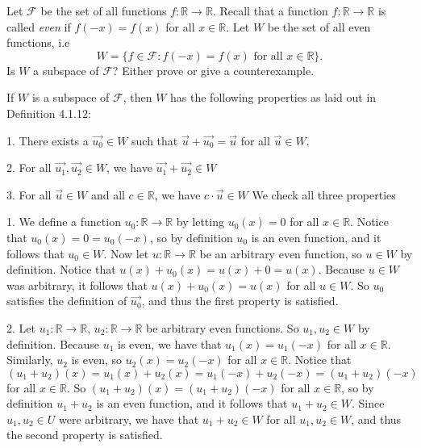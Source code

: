 \documentclass[12pt]{article}
\newenvironment{problem}[2][Problem]
{
	\begin{trivlist} 
		\item[\hskip \labelsep {\bfseries #1 #2:}]
	}
{
	\end{trivlist}
	}
\newenvironment{solution}[1][Solution]
{
	\begin{trivlist} 
		\item[\hskip \labelsep {\itshape #1:}]
	}
	{
	\end{trivlist}
}
\begin{document}
\newpage
\begin{problem}{6}
Let $\mathcal{F}$ be the set of all functions $f: \mathbb{R} \to \mathbb{R}$. Recall that a function $f: \mathbb{R} \to \mathbb{R}$ is called {\it even} if $f(-x) = f(x)$ for all $x \in \mathbb{R}$. Let $W$ be the set of all even functions, i.e
\[
W = \{ f \in \mathcal{F} : f(-x) = f(x) \text{ for all } x \in \mathbb{R} \} \text{.}
\]
Is $W$ a subspace of $\mathcal{F}$? Either prove or give a counterexample.
\noindent
\newline
\newline
\begin{solution}
 If $W$ is a subspace of $\mathcal{F}$, then $W$ has the following properties as laid out in Definition 4.1.12:

1. There exists a $\vec{u_0} \in W$ such that $\vec{u} + \vec{u_0} = \vec{u}$ for all $\vec{u} \in W$.

2. For all $\vec{u_1},\vec{u_2} \in W$, we have $\vec{u_1}+\vec{u_2} \in W$

3. For all $\vec{u} \in W$ and all $c \in \mathbb{R}$, we have $c\cdot \vec{u} \in W$
\noindent
\newline
\newline
We check all three properties

1. We define a function $u_0 :\mathbb{R} \to \mathbb{R}$ by letting $u_0 (x)=0$ for all $x \in \mathbb{R}$. Notice that $u_0 (x) = 0 = u_0(-x)$, so by definition $u_0$ is an even function, and it follows that $u_0 \in W$. Now let $u:\mathbb{R} \to \mathbb{R}$ be an arbitrary even function, so $u \in W$ by definition. Notice that $u(x) + u_0 (x) = u(x) + 0 = u(x)$. Because $u \in W$ was arbitrary, it follows that $u(x)+u_0(x) = u(x)$ for all $u \in W$. So $u_0$ satisfies the definition of $\vec{u_0}$, and thus the first property is satisfied.

2. Let $u_1:\mathbb{R} \to \mathbb{R}$,  $u_2:\mathbb{R} \to \mathbb{R}$ be arbitrary even functions. So $u_1,u_2 \in W$ by definition. %
Because $u_1$ is even, we have that $u_1(x) = u_1 (-x)$ for all $x \in \mathbb{R}$. Similarly, $u_2$ is even, so $u_2 (x) = u_2 (-x)$ for all $x \in \mathbb{R}$. Notice that $(u_1 +u_2)(x) = u_1(x) + u_2 (x) = u_1 (-x) + u_2 (-x)= (u_1 +u_2)(-x)$ for all $x \in \mathbb{R}$. So $(u_1+u_2)(x) = (u_1+u_2)(-x)$ for all $x \in \mathbb{R}$, so by definition $u_1 + u_2$ is an even function, and it follows that $u_1 + u_2 \in W$. Since $u_1,u_2 \in U$ were arbitrary, we have that $u_1 + u_2 \in W$ for all $u_1,u_2 \in W$, and thus the second property is satisfied.


\end{solution}
\end{problem}
\end{document}
